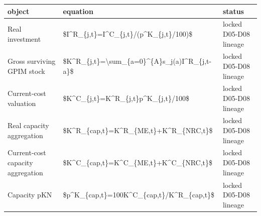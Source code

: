 
\begin{tabular}{lll}
\toprule
object & equation & status\\
\midrule
Real investment & \$I\textasciicircum{}R\_\{j,t\}=I\textasciicircum{}C\_\{j,t\}/(p\textasciicircum{}K\_\{j,t\}/100)\$ & locked D05-D08 lineage\\
Gross surviving GPIM stock & \$K\textasciicircum{}R\_\{j,t\}=\textbackslash{}sum\_\{a=0\}\textasciicircum{}\{A\}s\_j(a)I\textasciicircum{}R\_\{j,t-a\}\$ & locked D05-D08 lineage\\
Current-cost valuation & \$K\textasciicircum{}C\_\{j,t\}=K\textasciicircum{}R\_\{j,t\}p\textasciicircum{}K\_\{j,t\}/100\$ & locked D05-D08 lineage\\
Real capacity aggregation & \$K\textasciicircum{}R\_\{cap,t\}=K\textasciicircum{}R\_\{ME,t\}+K\textasciicircum{}R\_\{NRC,t\}\$ & locked D05-D08 lineage\\
Current-cost capacity aggregation & \$K\textasciicircum{}C\_\{cap,t\}=K\textasciicircum{}C\_\{ME,t\}+K\textasciicircum{}C\_\{NRC,t\}\$ & locked D05-D08 lineage\\
\addlinespace
Capacity pKN & \$p\textasciicircum{}K\_\{cap,t\}=100K\textasciicircum{}C\_\{cap,t\}/K\textasciicircum{}R\_\{cap,t\}\$ & locked D05-D08 lineage\\
\bottomrule
\end{tabular}
